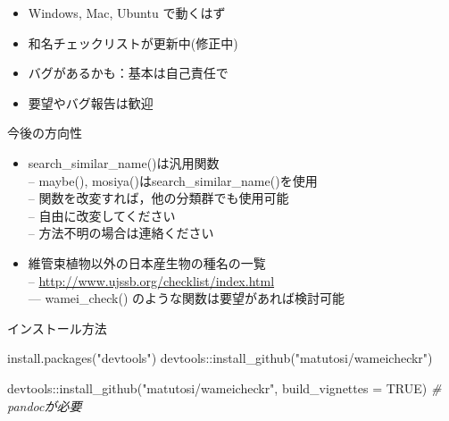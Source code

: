 \documentclass[
  a5paper,
  landscape,
  notitlepage]{report}
\newenvironment{Shaded}{\begin{snugshade}}{\end{snugshade}}
\newcommand{\AttributeTok}[1]{\textcolor[rgb]{0.77,0.63,0.00}{#1}}
\newcommand{\CommentTok}[1]{\textcolor[rgb]{0.56,0.35,0.01}{\textit{#1}}}
\newcommand{\ConstantTok}[1]{\textcolor[rgb]{0.00,0.00,0.00}{#1}}
\newcommand{\FunctionTok}[1]{\textcolor[rgb]{0.00,0.00,0.00}{#1}}
\newcommand{\NormalTok}[1]{#1}
\newcommand{\SpecialCharTok}[1]{\textcolor[rgb]{0.00,0.00,0.00}{#1}}
\newcommand{\StringTok}[1]{\textcolor[rgb]{0.31,0.60,0.02}{#1}}
\providecommand{\tightlist}{%
  \setlength{\itemsep}{0pt}\setlength{\parskip}{0pt}}
\begin{document}
\begin{itemize}
\tightlist
\item
  Windows, Mac, Ubuntu で動くはず\\
\item
  和名チェックリストが更新中(修正中)\\
\item
  バグがあるかも：基本は自己責任で\\
\item
  要望やバグ報告は歓迎
\end{itemize}

\newpage

\fontsize{32pt}{32pt}\selectfont

\begin{center}
今後の方向性
\end{center}

\fontsize{22pt}{22pt}\selectfont

\begin{itemize}
\tightlist
\item
  search\_similar\_name()は汎用関数\\
  -- maybe(), mosiya()はsearch\_similar\_name()を使用\\
  -- 関数を改変すれば，他の分類群でも使用可能\\
  -- 自由に改変してください\\
  -- 方法不明の場合は連絡ください\\
\item
  維管束植物以外の日本産生物の種名の一覧\\
  -- \url{http://www.ujssb.org/checklist/index.html}\\
  --- wamei\_check() のような関数は要望があれば検討可能
\end{itemize}

\newpage

\fontsize{32pt}{32pt}\selectfont

\begin{center}
インストール方法
\end{center}

\fontsize{22pt}{22pt}\selectfont

\begin{Shaded}
\begin{Highlighting}[]
\FunctionTok{install.packages}\NormalTok{(}\StringTok{"devtools"}\NormalTok{)}
\NormalTok{devtools}\SpecialCharTok{::}\FunctionTok{install\_github}\NormalTok{(}\StringTok{"matutosi/wameicheckr"}\NormalTok{)}

\NormalTok{devtools}\SpecialCharTok{::}\FunctionTok{install\_github}\NormalTok{(}\StringTok{"matutosi/wameicheckr"}\NormalTok{,   }
  \AttributeTok{build\_vignettes =} \ConstantTok{TRUE}\NormalTok{) }\CommentTok{\# pandocが必要}
\end{Highlighting}
\end{Shaded}
\end{document}
